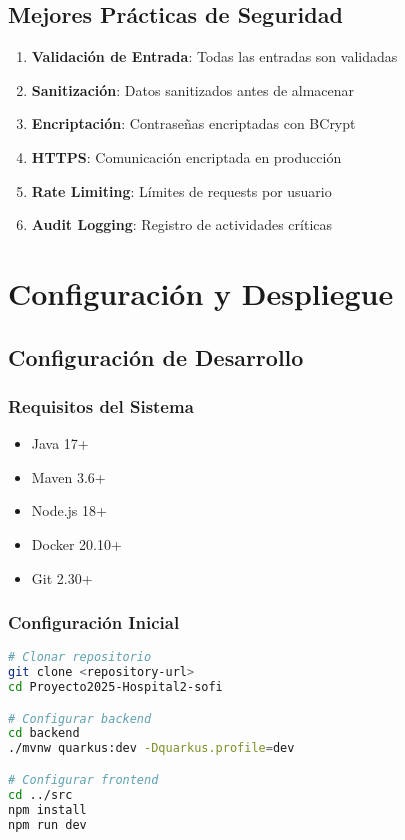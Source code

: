 \documentclass[12pt,a4paper]{article}
\begin{document}
\subsection{Mejores Prácticas de Seguridad}

\begin{enumerate}
    \item \textbf{Validación de Entrada}: Todas las entradas son validadas
    \item \textbf{Sanitización}: Datos sanitizados antes de almacenar
    \item \textbf{Encriptación}: Contraseñas encriptadas con BCrypt
    \item \textbf{HTTPS}: Comunicación encriptada en producción
    \item \textbf{Rate Limiting}: Límites de requests por usuario
    \item \textbf{Audit Logging}: Registro de actividades críticas
\end{enumerate}

\section{Configuración y Despliegue}

\subsection{Configuración de Desarrollo}

\subsubsection{Requisitos del Sistema}
\begin{itemize}
    \item Java 17+
    \item Maven 3.6+
    \item Node.js 18+
    \item Docker 20.10+
    \item Git 2.30+
\end{itemize}

\subsubsection{Configuración Inicial}
\begin{lstlisting}[language=bash]
# Clonar repositorio
git clone <repository-url>
cd Proyecto2025-Hospital2-sofi

# Configurar backend
cd backend
./mvnw quarkus:dev -Dquarkus.profile=dev

# Configurar frontend
cd ../src
npm install
npm run dev
\end{lstlisting}
\end{document}
